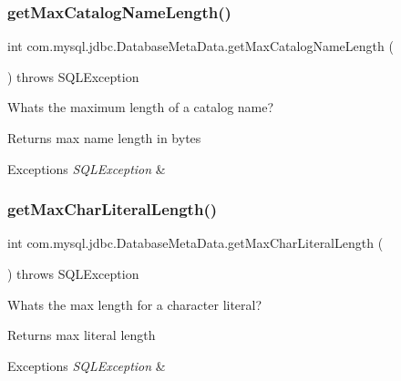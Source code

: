 \subsubsection{\texorpdfstring{get\+Max\+Catalog\+Name\+Length()}{getMaxCatalogNameLength()}}
{\footnotesize\ttfamily int com.\+mysql.\+jdbc.\+Database\+Meta\+Data.\+get\+Max\+Catalog\+Name\+Length (\begin{DoxyParamCaption}{ }\end{DoxyParamCaption}) throws S\+Q\+L\+Exception}

What\textquotesingle{}s the maximum length of a catalog name?

\begin{DoxyReturn}{Returns}
max name length in bytes 
\end{DoxyReturn}

\begin{DoxyExceptions}{Exceptions}
{\em S\+Q\+L\+Exception} & \\
\hline
\end{DoxyExceptions}
\mbox{\label{classcom_1_1mysql_1_1jdbc_1_1_database_meta_data_afc0631adb18ae781b9c25bd3838dd74a}} 
\subsubsection{\texorpdfstring{get\+Max\+Char\+Literal\+Length()}{getMaxCharLiteralLength()}}
{\footnotesize\ttfamily int com.\+mysql.\+jdbc.\+Database\+Meta\+Data.\+get\+Max\+Char\+Literal\+Length (\begin{DoxyParamCaption}{ }\end{DoxyParamCaption}) throws S\+Q\+L\+Exception}

What\textquotesingle{}s the max length for a character literal?

\begin{DoxyReturn}{Returns}
max literal length 
\end{DoxyReturn}

\begin{DoxyExceptions}{Exceptions}
{\em S\+Q\+L\+Exception} & \\
\hline
\end{DoxyExceptions}
\mbox{\label{classcom_1_1mysql_1_1jdbc_1_1_database_meta_data_a630db9c551a23a5d0737a53f5449c01a}} 
